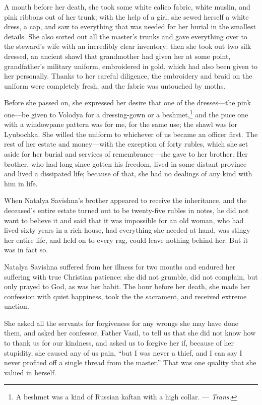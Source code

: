 A month before her death, she took some white calico fabric, white muslin, and pink ribbons out of her trunk; with the help of a girl, she sewed herself a white dress, a cap, and saw to everything that was needed for her burial in the smallest details. She also sorted out all the master's trunks and gave everything over to the steward's wife with an incredibly clear inventory: then she took out two silk dressed, an ancient shawl that grandmother had given her at some point, grandfather's military uniform, embroidered in gold, which had also been given to her personally. Thanks to her careful diligence, the embroidery and braid on the uniform were completely fresh, and the fabric was untouched by moths.

Before she passed on, she expressed her desire that one of the dresses---the pink one---be given to Volodya for a dressing-gown or a beshmet,\footnote{A beshmet was a kind of Russian kaftan with a high collar. --- \textit{Trans.}} and the puce one with a windowpane pattern was for me, for the same use; the shawl was for Lyubochka. She willed the uniform to whichever of us became an officer first. The rest of her estate and money---with the exception of forty rubles, which she set aside for her burial and services of remembrance---she gave to her brother. Her brother, who had long since gotten his freedom, lived in some distant province and lived a dissipated life; because of that, she had no dealings of any kind with him in life. 

When Natalya Savishna's brother appeared to receive the inheritance, and the deceased's entire estate turned out to be twenty-five rubles in notes, he did not want to believe it and said that it was impossible for an old woman, who had lived sixty years in a rich house, had everything she needed at hand, was stingy her entire life, and held on to every rag, could leave nothing behind her. But it was in fact so.

Natalya Savishna suffered from her illness for two months and endured her suffering with true Christian patience: she did not grumble, did not complain, but only prayed to God, as was her habit. The hour before her death, she made her confession with quiet happiness, took the the sacrament, and received extreme unction.

She asked all the servants for forgiveness for any wrongs she may have done them, and asked her confessor, Father Vasil, to tell us that she did not know how to thank us for our kindness, and asked us to forgive her if, because of her stupidity, she caused any of us pain, ``but I was never a thief, and I can say I never profited off a single thread from the master.'' That was one quality that she valued in herself.


